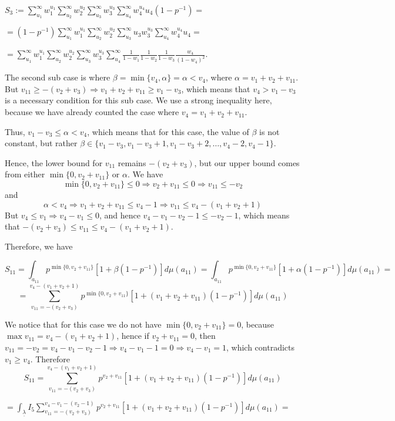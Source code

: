 \documentclass{article}
\begin{document}
$S_{3}:=\sum_{u_{1}}^{\infty}w_{1}^{u_{1}}\sum_{u_{2}}^{\infty}w_{2}^{u_{2}}\sum_{u_{3}}^{\infty}w_{3}^{u_{3}}\sum_{u_{4}}^{\infty}w_{4}^{u_{4}}u_{4}(1-p^{-1})=$

$=(1-p^{-1})\sum_{u_{1}}^{\infty}w_{1}^{u_{1}}\sum_{u_{2}}^{\infty}w_{2}^{u_{2}}\sum_{u_{3}}^{\infty}u_{3}w_{3}^{u_{3}}\sum_{u_{4}}^{\infty}w_{4}^{u_{4}}u_{4}=$

$=\sum_{u_{1}}^{\infty}w_{1}^{u_{1}}\sum_{u_{2}}^{\infty}w_{2}^{u_{2}}\sum_{u_{3}}^{\infty}w_{3}^{u_{3}}\sum_{u_{4}}^{\infty}\frac{1}{1-w_{1}}\frac{1}{1-w_{2}}\frac{1}{1-w_{3}}\frac{w_{4}}{(1-w_{4})^{2}}$.

The second sub case is where $\beta=\min\{v_4,\alpha\}=\alpha<v_{4}$, where $\alpha=v_1+v_2+v_{11}$. 
But $v_{11}\geq{-(v_2+v_3)}\Rightarrow{v_1+v_2+v_{11}\geq{v_1-v_3}}$, which means that ${v_{4}>v_1-v_3}$ is a necessary condition for this sub case. We use a strong inequality here, because we have already counted the case where $v_4=v_1+v_2+v_{11}$.

Thus, $v_1-v_3\leq\alpha<v_4$, which means that for this case, the value of $\beta$ is not constant, but rather $\beta\in\{v_1-v_3,v_1-v_3+1,v_1-v_3+2,\dots,v_4-2,v_4-1\}$.

Hence, the lower bound for $v_{11}$ remains $-(v_2+v_3)$, but our upper bound comes from either $\min\{0,v_2+v_{11}\}$ or $\alpha$. We have \[\min\{0,v_2+v_{11}\}\leq{0}\Rightarrow{v_2+v_{11}\leq{0}}\Rightarrow{v_{11}\leq{-v_2}}\] 
and \[\alpha<v_4\Rightarrow{v_1+v_2+v_{11}\leq{v_4-1}}\Rightarrow{v_{11}\leq{v_4-(v_1+v_2+1)}}\]
But $v_4\leq{v_1}\Rightarrow{v_4-v_1\leq{0}}$, and hence $v_4-v_1-v_2-1\leq{-v_2-1}$, which means that $-(v_2+v_3)\leq{v_{11}}\leq{v_4-(v_1+v_2+1)}$.

Therefore, we have

\[S_{11}=\displaystyle\int_{a_{11}}p^{\min\{0,v_{2}+v_{11}\}}[1+\beta(1-p^{-1})]d\mu(a_{11})=\displaystyle\int_{a_{11}}p^{\min\{0,v_{2}+v_{11}\}}[1+\alpha(1-p^{-1})]d\mu(a_{11})=\]
\[=\sum_{v_{11}=-(v_2+v_3)}^{v_{4}-(v_1+v_2+1)}p^{\min\{0,v_2+v_{11}\}}[1+(v_1+v_2+v_{11})(1-p^{-1})]d\mu(a_{11})\]

We notice that for this case we do not have $\min\{0,v_2+v_{11}\}=0$, because $\max{v_{11}}=v_4-(v_1+v_2+1)$, hence if $v_2+v_{11}=0$, then $v_{11}=-v_2=v_4-v_1-v_2-1\Rightarrow{v_4-v_1-1=0}\Rightarrow{v_4-v_1=1}$, which contradicts $v_1\geq{v_4}$. Therefore 
\[S_{11}=\sum_{v_{11}=-(v_2+v_3)}^{v_{4}-(v_1+v_2+1)}p^{v_2+v_{11}}[1+(v_1+v_2+v_{11})(1-p^{-1})]d\mu(a_{11})\]

$=\displaystyle\int_{\underline\lambda}I_{5}\sum_{v_{11}=-(v_2+v_3)}^{v_{4}-v_1-(v_2-1)}p^{v_{2}+v_{11}}[1+(v_1+v_2+v_{11})(1-p^{-1})]d\mu(a_{11})=$
\end{document}
